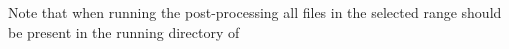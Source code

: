 Note that when running the post-processing all 
 files in the selected range should 
be present in the running directory of 

%
%
%
%
